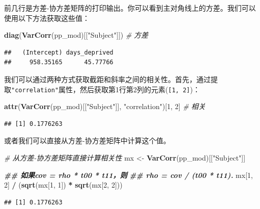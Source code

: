 \documentclass[
]{book}
\newenvironment{Shaded}{\begin{snugshade}}{\end{snugshade}}
\newcommand{\CommentTok}[1]{\textcolor[rgb]{0.56,0.35,0.01}{\textit{#1}}}
\newcommand{\DecValTok}[1]{\textcolor[rgb]{0.00,0.00,0.81}{#1}}
\newcommand{\DocumentationTok}[1]{\textcolor[rgb]{0.56,0.35,0.01}{\textbf{\textit{#1}}}}
\newcommand{\FunctionTok}[1]{\textcolor[rgb]{0.13,0.29,0.53}{\textbf{#1}}}
\newcommand{\NormalTok}[1]{#1}
\newcommand{\OtherTok}[1]{\textcolor[rgb]{0.56,0.35,0.01}{#1}}
\newcommand{\SpecialCharTok}[1]{\textcolor[rgb]{0.81,0.36,0.00}{\textbf{#1}}}
\newcommand{\StringTok}[1]{\textcolor[rgb]{0.31,0.60,0.02}{#1}}
\begin{document}
前几行是方差-协方差矩阵的打印输出。你可以看到主对角线上的方差。我们可以使用以下方法获取这些值：

\begin{Shaded}
\begin{Highlighting}[]
\FunctionTok{diag}\NormalTok{(}\FunctionTok{VarCorr}\NormalTok{(pp\_mod)[[}\StringTok{"Subject"}\NormalTok{]]) }\CommentTok{\# 方差}
\end{Highlighting}
\end{Shaded}

\begin{verbatim}
##   (Intercept) days_deprived 
##     958.35165      45.77766
\end{verbatim}

我们可以通过两种方式获取截距和斜率之间的相关性。首先，通过提取\texttt{"correlation"}属性，然后获取第1行第2列的元素(\texttt{{[}1,\ 2{]}})：

\begin{Shaded}
\begin{Highlighting}[]
\FunctionTok{attr}\NormalTok{(}\FunctionTok{VarCorr}\NormalTok{(pp\_mod)[[}\StringTok{"Subject"}\NormalTok{]], }\StringTok{"correlation"}\NormalTok{)[}\DecValTok{1}\NormalTok{, }\DecValTok{2}\NormalTok{] }\CommentTok{\# 相关}
\end{Highlighting}
\end{Shaded}

\begin{verbatim}
## [1] 0.1776263
\end{verbatim}

或者我们可以直接从方差-协方差矩阵中计算这个值。

\begin{Shaded}
\begin{Highlighting}[]
\CommentTok{\# 从方差{-}协方差矩阵直接计算相关性}
\NormalTok{mx }\OtherTok{\textless{}{-}} \FunctionTok{VarCorr}\NormalTok{(pp\_mod)[[}\StringTok{"Subject"}\NormalTok{]]}

\DocumentationTok{\#\# 如果cov = rho * t00 * t11，则}
\DocumentationTok{\#\# rho = cov / (t00 * t11).}
\NormalTok{mx[}\DecValTok{1}\NormalTok{, }\DecValTok{2}\NormalTok{] }\SpecialCharTok{/}\NormalTok{ (}\FunctionTok{sqrt}\NormalTok{(mx[}\DecValTok{1}\NormalTok{, }\DecValTok{1}\NormalTok{]) }\SpecialCharTok{*} \FunctionTok{sqrt}\NormalTok{(mx[}\DecValTok{2}\NormalTok{, }\DecValTok{2}\NormalTok{]))}
\end{Highlighting}
\end{Shaded}

\begin{verbatim}
## [1] 0.1776263
\end{verbatim}
\end{document}
